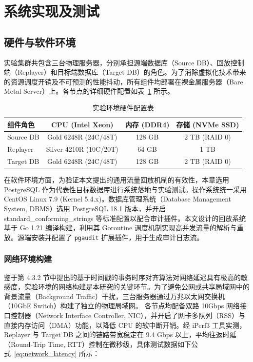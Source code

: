 \newpage
\setcounter{table}{0}
\setcounter{figure}{0}
\section{系统实现及测试}

\subsection{硬件与软件环境}

实验集群共包含三台物理服务器，分别承担源端数据库（Source DB）、回放控制端（Replayer）和目标端数据库（Target DB）的角色。为了消除虚拟化技术带来的资源调度开销及不可预测的性能抖动，所有组件均部署在裸金属服务器（Bare Metal Server）上。各节点的详细硬件配置如表~\ref{tab:hardware_config} 所示。

\begin{table}[htbp]
    \centering
    \caption{实验环境硬件配置表}
    \label{tab:hardware_config}
    \renewcommand{\arraystretch}{1.2}
    \begin{tabular}{lccc}
        \toprule
        \textbf{组件角色} & \textbf{CPU (Intel Xeon)} & \textbf{内存 (DDR4)} & \textbf{存储 (NVMe SSD)} \\
        \midrule
        Source DB  & Gold 6248R (24C/48T) & 128 GB & 2 TB (RAID 0) \\
        Replayer  & Silver 4210R (10C/20T) & 64 GB & 1 TB \\
        Target DB  & Gold 6248R (24C/48T) & 128 GB & 2 TB (RAID 0) \\
        \bottomrule
    \end{tabular}
\end{table}

在软件环境方面，为验证本文提出的通用流量回放机制的有效性，本章选用 PostgreSQL 作为代表性目标数据库进行系统落地与实验测试。操作系统统一采用 CentOS Linux 7.9 (Kernel 5.4.x)。数据库管理系统（Database Management System, DBMS）选用 PostgreSQL 18.1 版本\cite{PostgreSQLDoc}，并开启 standard\_conforming\_strings 等标准配置以配合审计插件。本文设计的回放系统基于 Go 1.21\cite{GoSpec} 编译构建，利用其 Goroutine 调度机制实现高并发流量的解析与重放。源端安装并配置了 \texttt{pgaudit} 扩展插件\cite{pgaudit}，用于生成审计日志流。

\subsubsection{网络环境构建}

鉴于第 4.3.2 节中提出的基于时间戳的事务时序对齐算法对网络延迟具有极高的敏感度，实验环境的网络构建是本研究的关键环节。为了避免公网或共享局域网中的背景流量（Background Traffic）干扰，三台服务器通过万兆以太网交换机（10GbE Switch）构建了独立的物理局域网。
各节点均配备双路 10Gbps 网络接口控制器（Network Interface Controller, NIC），并开启了网卡多队列（RSS）与直接内存访问（DMA）功能，以降低 CPU 的软中断开销。经 iPerf3 工具实测，Replayer 与 Target DB 之间的链路带宽稳定在 9.4 Gbps 以上，平均往返时延（Round-Trip Time, RTT）控制在微秒级，具体测试数据如下公式~\ref{eq:network_latency} 所示：

